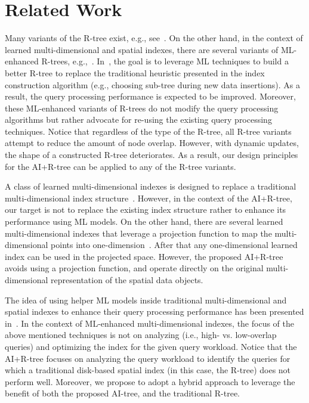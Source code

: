 \section{Related Work}
\label{section:related_work}
Many variants of the R-tree exist, e.g., see~\cite{guttman1984r, sellis1987r+, beckmann1990r, beckmann2009revised, samet2006foundations, manolopoulos2010r, sidlauskas2018improving, arge2008priority, kamel1993hilbert}. On the other hand, in the context of learned multi-dimensional and spatial indexes, there are several variants of ML-enhanced R-trees, e.g.,~\cite{gu2021rlr, yang2023platon, huang2023acr}. In~\cite{gu2021rlr, yang2023platon, huang2023acr}, the goal is to leverage ML techniques to build a better R-tree to replace the traditional heuristic presented in the index construction algorithm (e.g., choosing sub-tree during new data insertions).
As a result, the query processing performance is expected to be improved. Moreover, these ML-enhanced variants of R-trees do not modify the query processing algorithms 
but 
rather advocate for re-using the existing query processing techniques. Notice that regardless of the type of the R-tree, all R-tree variants attempt to reduce the amount of node overlap. However, with dynamic updates, the shape of 
a
constructed R-tree deteriorates. As a result, our design principles for the AI+R-tree can be applied to any of the R-tree variants.

A class of learned multi-dimensional indexes is designed to replace a traditional multi-dimensional index structure~\cite{al2024survey,al2020tutorial,liu2024good,li2024survey}. However, in the context of the AI+R-tree, our target is not to replace the existing index structure rather to enhance its performance using ML models. On the other hand, there are several learned multi-dimensional indexes that leverage a projection function to map the multi-dimensional points into one-dimension~\cite{al2024survey,al2020tutorial,liu2024good,li2024survey}. After that any one-dimensional learned index can be used in the projected space. However, the proposed AI+R-tree avoids using a projection function, and operate directly on the original multi-dimensional representation of the spatial data objects.

The idea of using helper ML models inside traditional multi-dimensional and spatial indexes to enhance their query processing performance 
has
been presented in~\cite{hadian2020handsoff, pandey2020case, kang2021the}. In the context of ML-enhanced multi-dimensional indexes, the focus of the above mentioned techniques is not on analyzing (i.e., high- vs. low-overlap queries) and optimizing the index for the given query workload. Notice that the AI+R-tree focuses on analyzing the query workload to identify the queries for which a traditional disk-based spatial index (in this case, the R-tree) does not perform well. Moreover, we propose to adopt a hybrid approach to leverage the benefit of both the proposed AI-tree, and the traditional R-tree.

